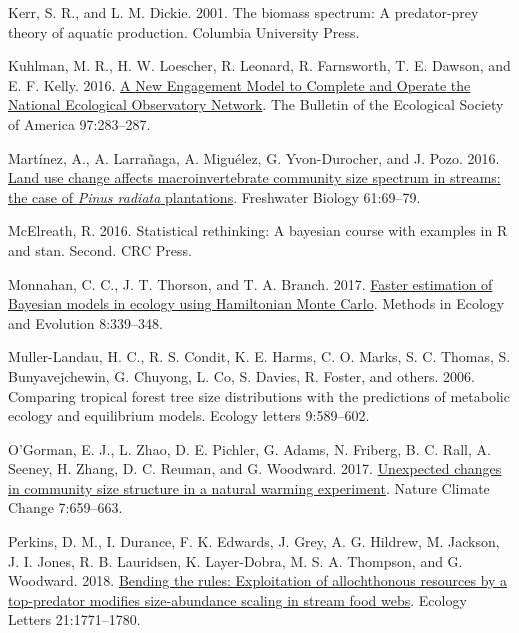 \documentclass[
  12pt,
]{article}
\newlength{\cslhangindent}
\newlength{\cslentryspacingunit} %
\newenvironment{CSLReferences}[2] %
 {%
  \setlength{\parindent}{0pt}
  \ifodd #1
  \let\oldpar\par
  \def\par{\hangindent=\cslhangindent\oldpar}
  \fi
  \setlength{\parskip}{#2\cslentryspacingunit}
 }%
 {}
\numberwithin{equation}
\begin{document}
\begin{CSLReferences}{1}{0}
\leavevmode{}%
Kerr, S. R., and L. M. Dickie. 2001. The biomass spectrum: {A}
predator-prey theory of aquatic production. {Columbia University Press}.

\leavevmode{}%
Kuhlman, M. R., H. W. Loescher, R. Leonard, R. Farnsworth, T. E. Dawson,
and E. F. Kelly. 2016. \href{https://doi.org/10.1002/bes2.1248}{A {New
Engagement Model} to {Complete} and {Operate} the {National Ecological
Observatory Network}}. The Bulletin of the Ecological Society of America
97:283--287.

\leavevmode{}%
Martínez, A., A. Larrañaga, A. Miguélez, G. Yvon-Durocher, and J. Pozo.
2016. \href{https://doi.org/10.1111/fwb.12680}{Land use change affects
macroinvertebrate community size spectrum in streams: the case of
{\emph{Pinus radiata}} plantations}. Freshwater Biology 61:69--79.

\leavevmode{}%
McElreath, R. 2016. Statistical rethinking: {A} bayesian course with
examples in {R} and stan. Second. {CRC Press}.

\leavevmode{}%
Monnahan, C. C., J. T. Thorson, and T. A. Branch. 2017.
\href{https://doi.org/10.1111/2041-210X.12681}{Faster estimation of
{Bayesian} models in ecology using {Hamiltonian Monte Carlo}}. Methods
in Ecology and Evolution 8:339--348.

\leavevmode{}%
Muller-Landau, H. C., R. S. Condit, K. E. Harms, C. O. Marks, S. C.
Thomas, S. Bunyavejchewin, G. Chuyong, L. Co, S. Davies, R. Foster, and
others. 2006. Comparing tropical forest tree size distributions with the
predictions of metabolic ecology and equilibrium models. Ecology letters
9:589--602.

\leavevmode{}%
O'Gorman, E. J., L. Zhao, D. E. Pichler, G. Adams, N. Friberg, B. C.
Rall, A. Seeney, H. Zhang, D. C. Reuman, and G. Woodward. 2017.
\href{https://doi.org/10.1038/nclimate3368}{Unexpected changes in
community size structure in a natural warming experiment}. Nature
Climate Change 7:659--663.

\leavevmode{}%
Perkins, D. M., I. Durance, F. K. Edwards, J. Grey, A. G. Hildrew, M.
Jackson, J. I. Jones, R. B. Lauridsen, K. Layer-Dobra, M. S. A.
Thompson, and G. Woodward. 2018.
\href{https://doi.org/10.1111/ele.13147}{Bending the rules: Exploitation
of allochthonous resources by a top-predator modifies size-abundance
scaling in stream food webs}. Ecology Letters 21:1771--1780.


\end{CSLReferences}
\end{document}
